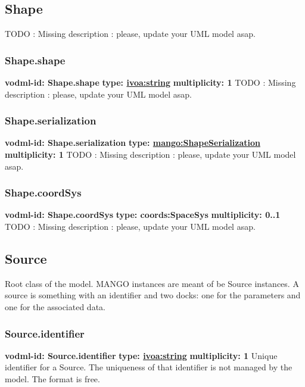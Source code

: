   \subsection{Shape}
  \label{sect:Shape}
    TODO : Missing description : please, update your UML model asap.

    \subsubsection{Shape.shape}
      \textbf{vodml-id: Shape.shape} \newline
      \textbf{type: \hyperref[sect:ivoa]{ivoa:string}} \newline
      \textbf{multiplicity: 1} \newline
      TODO : Missing description : please, update your UML model asap.

    \subsubsection{Shape.serialization}
      \textbf{vodml-id: Shape.serialization} \newline
      \textbf{type: \hyperref[sect:ShapeSerialization]{mango:ShapeSerialization}} \newline
      \textbf{multiplicity: 1} \newline
      TODO : Missing description : please, update your UML model asap.

    \subsubsection{Shape.coordSys}
      \textbf{vodml-id: Shape.coordSys} \newline
      \textbf{type: coords:SpaceSys} \newline
      \textbf{multiplicity: 0..1} \newline
      TODO : Missing description : please, update your UML model asap.

  \subsection{Source}
  \label{sect:Source}
    Root class of the model. MANGO instances are meant of be Source instances. A source is something with an identifier and two docks: one for the parameters and one for the associated data.

    \subsubsection{Source.identifier}
      \textbf{vodml-id: Source.identifier} \newline
      \textbf{type: \hyperref[sect:ivoa]{ivoa:string}} \newline
      \textbf{multiplicity: 1} \newline
      Unique identifier for a Source. The uniqueness of that identifier is not managed by the model. The format is free.

